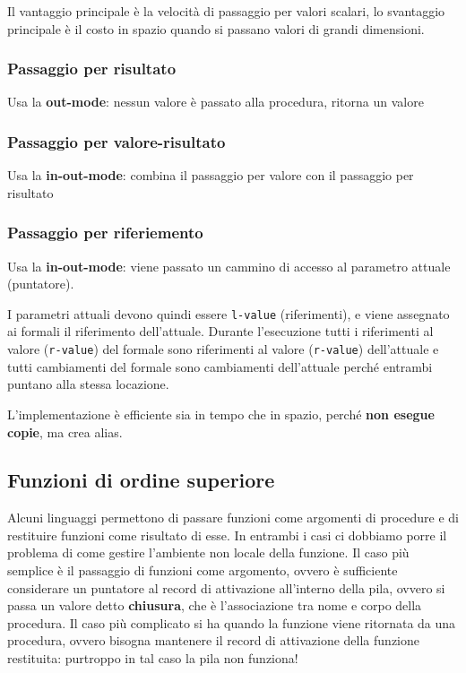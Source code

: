 \documentclass[12pt,a4paper]{article}
\begin{document}
Il vantaggio principale è la velocità di passaggio per valori scalari, lo svantaggio principale è il costo in spazio quando si passano valori di grandi dimensioni.

\subsubsection{Passaggio per risultato}
Usa la \textbf{out-mode}: nessun valore è passato alla procedura, ritorna un valore

\subsubsection{Passaggio per valore-risultato}
Usa la \textbf{in-out-mode}: combina il passaggio per valore con il passaggio per risultato

\subsubsection{Passaggio per riferiemento}
Usa la \textbf{in-out-mode}: viene passato un cammino di accesso al parametro attuale (puntatore).

I parametri attuali devono quindi essere \texttt{l-value} (riferimenti), e viene assegnato ai formali il riferimento dell'attuale. Durante l'esecuzione tutti i riferimenti al valore (\texttt{r-value}) del formale sono riferimenti al valore (\texttt{r-value}) dell'attuale e tutti cambiamenti del formale sono cambiamenti dell'attuale perché entrambi puntano alla stessa locazione.

L'implementazione è efficiente sia in tempo che in spazio, perché \textbf{non esegue copie}, ma crea alias.

\subsection{Funzioni di ordine superiore}
Alcuni linguaggi permettono di passare funzioni come argomenti di procedure e di restituire funzioni come risultato di esse. In entrambi i casi ci dobbiamo porre il problema di come gestire l'ambiente non locale della funzione. Il caso più semplice è il passaggio di funzioni come argomento, ovvero è sufficiente considerare un puntatore al record di attivazione all'interno della pila, ovvero si passa un valore detto \textbf{chiusura}, che è l'associazione tra nome e corpo della procedura. Il caso più complicato si ha quando la funzione viene ritornata da una procedura, ovvero bisogna mantenere il record di attivazione della funzione restituita: purtroppo in tal caso la pila non funziona!
\end{document}
